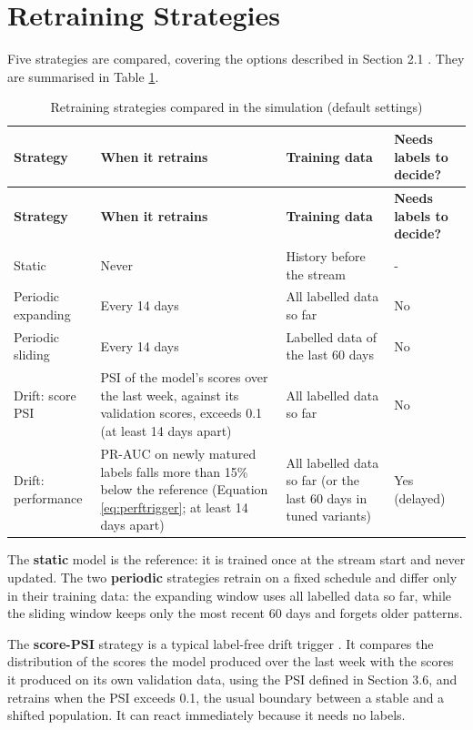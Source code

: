 \section{Retraining Strategies}

Five strategies are compared, covering the options described in Section 2.1 \cite{pulicharla2019,dalpozzolo2018}. They are summarised in Table \ref{tab:strategies}.

{\footnotesize
\begin{longtable}{>{\raggedright\arraybackslash}p{}>{\raggedright\arraybackslash}p{}>{\raggedright\arraybackslash}p{}>{\raggedright\arraybackslash}p{}}
\caption{Retraining strategies compared in the simulation (default settings)}\label{tab:strategies}\\
\toprule
\textbf{Strategy} & \textbf{When it retrains} & \textbf{Training data} & \textbf{Needs labels to decide?} \\
\midrule
\endfirsthead
\toprule
\textbf{Strategy} & \textbf{When it retrains} & \textbf{Training data} & \textbf{Needs labels to decide?} \\
\midrule
\endhead
Static & Never & History before the stream & - \\ \midrule
Periodic expanding & Every 14 days & All labelled data so far & No \\ \midrule
Periodic sliding & Every 14 days & Labelled data of the last 60 days & No \\ \midrule
Drift: score PSI & PSI of the model's scores over the last week, against its validation scores, exceeds 0.1 (at least 14 days apart) & All labelled data so far & No \\ \midrule
Drift: performance & PR-AUC on newly matured labels falls more than 15\% below the reference (Equation \ref{eq:perftrigger}; at least 14 days apart) & All labelled data so far (or the last 60 days in tuned variants) & Yes (delayed) \\ \bottomrule
\end{longtable}
}

The \textbf{static} model is the reference: it is trained once at the stream start and never updated. The two \textbf{periodic} strategies retrain on a fixed schedule and differ only in their training data: the expanding window uses all labelled data so far, while the sliding window keeps only the most recent 60 days and forgets older patterns.

The \textbf{score-PSI} strategy is a typical label-free drift trigger \cite{shakil2025,wong2025}. It compares the distribution of the scores the model produced over the last week with the scores it produced on its own validation data, using the PSI defined in Section 3.6, and retrains when the PSI exceeds 0.1, the usual boundary between a stable and a shifted population. It can react immediately because it needs no labels.

